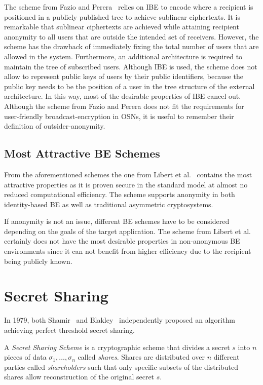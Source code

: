 The scheme from Fazio and Perera~\cite{art:FazioP12} relies on IBE to encode where a recipient is positioned in a publicly published tree to achieve sublinear ciphertexts. It is remarkable that sublinear ciphertexts are achieved while attaining recipient anonymity to all users that are outside the intended set of receivers. However, the scheme has the drawback of immediately fixing the total number of users that are allowed in the system. Furthermore, an additional architecture is required to maintain the tree of subscribed users. Although IBE is used, the scheme does not allow to represent public keys of users by their public identifiers, because the public key needs to be the position of a user in the tree structure of the external architecture. In this way, most of the desirable properties of IBE cancel out. Although the scheme from Fazio and Perera does not fit the requirements for user-friendly broadcast-encryption in OSNs, it is useful to remember their definition of outsider-anonymity.

\subsection{Most Attractive BE Schemes}
From the aforementioned schemes the one from Libert et al.~\cite{art:LibertQ03} contains the most attractive properties as it is proven secure in the standard model at almost no reduced computational efficiency. The scheme supports anonymity in both identity-based BE as well as traditional asymmetric cryptosystems.

If anonymity is not an issue, different BE schemes have to be considered depending on the goals of the target application. The scheme from Libert et al.~\cite{art:LibertPQ12} certainly does not have the most desirable properties in non-anonymous BE environments since it can not benefit from higher efficiency due to the recipient being publicly known.

\section{Secret Sharing}
In 1979, both Shamir~\cite{art:Shamir79} and Blakley~\cite{art:Blakley79} independently proposed an algorithm achieving perfect threshold secret sharing.

\begin{defn}
\label{def:secret_sharing_scheme}
 A \textit{Secret Sharing Scheme} is a cryptographic scheme that divides a secret $s$ into $n$ pieces of data $\sigma_1, \ldots, \sigma_n$ called \textit{shares}. Shares are distributed over $n$ different parties called \textit{shareholders} such that only specific subsets of the distributed shares allow reconstruction of the original secret $s$.
\end{defn}

